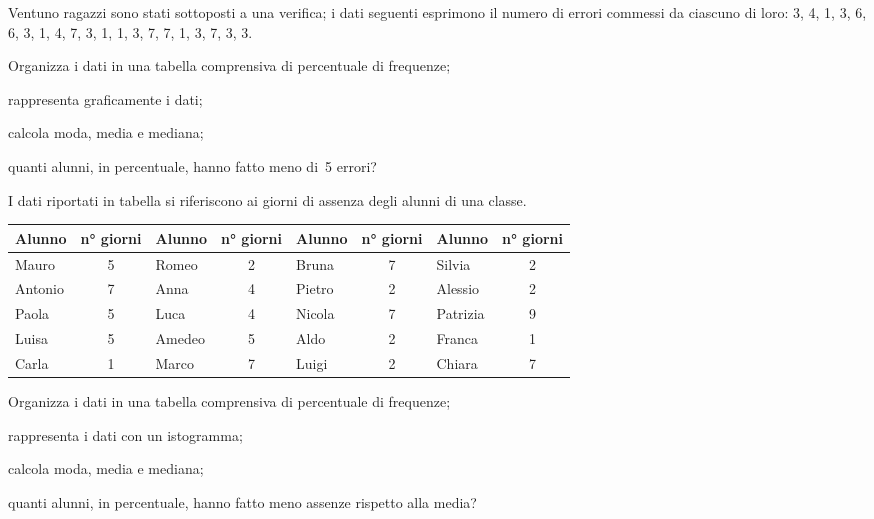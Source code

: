 \begin{esercizio}
\label{ese:A.43}
Ventuno ragazzi sono stati sottoposti a una verifica; i dati seguenti esprimono il numero di errori commessi da ciascuno
di loro: 3, 4, 1, 3, 6, 6, 3, 1, 4, 7, 3, 1, 1, 3, 7, 7, 1, 3, 7, 3, 3.
\begin{enumeratea}
 \item Organizza i dati in una tabella comprensiva di percentuale di frequenze;
 \item rappresenta graficamente i dati;
 \item calcola moda, media e mediana;
 \item quanti alunni, in percentuale, hanno fatto meno di~5 errori?
\end{enumeratea}
\end{esercizio}

\begin{esercizio}
\label{ese:A.44}
I dati riportati in tabella si riferiscono ai giorni di assenza degli alunni di una classe.
\begin{center}
 \begin{tabular}{*{4}{lc}}
\toprule
Alunno & n° giorni & Alunno & n° giorni & Alunno & n° giorni & Alunno & n° giorni\\
\midrule
Mauro & 5 & Romeo & 2 & Bruna & 7 & Silvia & 2\\
Antonio & 7 & Anna & 4 & Pietro & 2 & Alessio & 2\\
Paola & 5 & Luca & 4 & Nicola & 7 & Patrizia & 9\\
Luisa & 5 & Amedeo & 5 & Aldo & 2 & Franca & 1\\
Carla & 1 & Marco & 7 & Luigi & 2 & Chiara & 7\\
\bottomrule
\end{tabular}
\end{center}
\begin{enumeratea}
 \item Organizza i dati in una tabella comprensiva di percentuale di frequenze;
 \item rappresenta i dati con un istogramma;
 \item calcola moda, media e mediana;
 \item quanti alunni, in percentuale, hanno fatto meno assenze rispetto alla media?
\end{enumeratea}
\end{esercizio}

